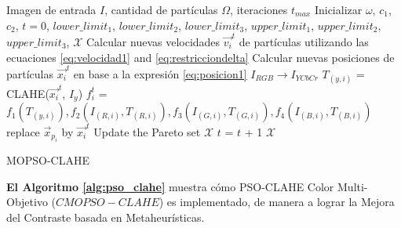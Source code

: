\begin{algorithm}[H]
\scriptsize
\begin{algorithmic}[1]
\Require Imagen de entrada $I$, cantidad de partículas $\Omega$\label{symbol:mopsocantparticulas}, iteraciones $t_{max}$ 
\State Inicializar $\omega$, $c_1$, $c_2$, $t=0$, $lower\_limit_1$, $lower\_limit_2$, $lower\_limit_3$, $upper\_limit_1$, $upper\_limit_2$, $upper\_limit_3$, $\mathscr{X}$
        \State Calcular nuevas velocidades $\overrightarrow{v_i}^t$ de partículas utilizando las ecuaciones \eqref{eq:velocidad1} and \eqref{eq:restricciondelta}
        \State Calcular nuevas posiciones de partículas $\overrightarrow{x_i}^t$ en base a la expresión \eqref{eq:posicion1}
        \State $I_{RGB} \longrightarrow I_{YCbCr}$
        \State ${T_{(y,i)}}$ = CLAHE(${\overrightarrow{x_i}^t}$, ${I_y}$)
                \State ${f^t_i}$ = $f_1({T_{(y,i)}}),f_2({I_{(R,i)},T_{(R,i)}}),f_3({I_{(G,i)},T_{(G,i)}}),f_4({I_{(B,i)},T_{(B,i)}})$%
                \State replace $\overrightarrow{x}_{p_i}$ by $\overrightarrow{x_i}^t$
                \EndIf
                \State Update the Pareto set $\mathscr{X}$
                \EndIf
                \State $t$ = $t$ + 1
                \EndFor
                \EndWhile
                \Ensure $\mathscr{X}$
                \end{algorithmic}
                \caption{MOPSO-CLAHE}
                \label{alg:pso_clahe}
                \end{algorithm}

                \textbf {El Algoritmo \ref{alg:pso_clahe}} muestra cómo PSO-CLAHE Color Multi-Objetivo ($CMOPSO-CLAHE$) es implementado, de manera a lograr la Mejora del Contraste basada en Metaheurísticas. 

